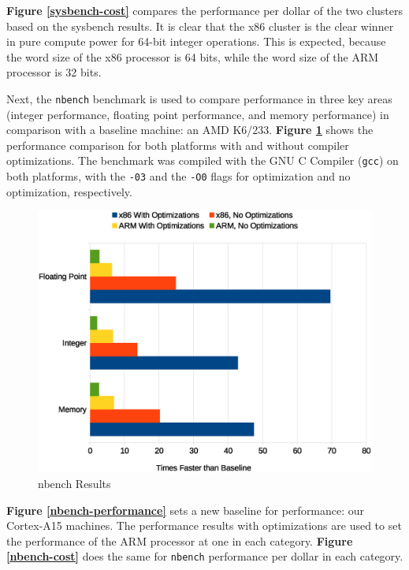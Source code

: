 \documentclass[11pt]{book}
\begin{document}
\textbf{Figure \ref{sysbench-cost}} compares the performance per dollar of the
two clusters based on the sysbench results. It is clear that the x86 cluster is
the clear winner in pure compute power for 64-bit integer operations. This is
expected, because the word size of the x86 processor is 64 bits, while the word
size of the ARM processor is 32 bits.

Next, the \verb;nbench; benchmark \cite{nbench} is used to compare performance
in three key areas (integer performance, floating point performance, and memory
performance) in comparison with a baseline machine: an AMD
K6/233. \textbf{Figure \ref{nbench-all}} shows the performance comparison for
both platforms with and without compiler optimizations. The benchmark was
compiled with the GNU C Compiler (\verb;gcc;) on both platforms, with the
\verb;-03; and the \verb;-O0; flags for optimization and no optimization,
respectively.

\begin{figure}
\centering
\includegraphics[width=\textwidth]{nbench_all}
\caption{nbench Results}
\label{nbench-all}
\end{figure}

\textbf{Figure \ref{nbench-performance}} sets a new baseline for performance:
our Cortex-A15 machines. The performance results with optimizations are used to
set the performance of the ARM processor at one in each category. \textbf{Figure
  \ref{nbench-cost}} does the same for \verb;nbench; performance per dollar in
each category.
\end{document}
